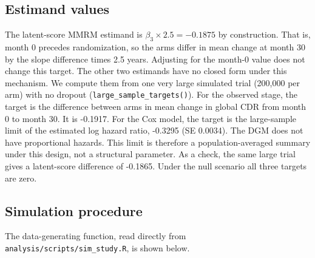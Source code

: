\documentclass[
  11pt,
]{article}
\begin{document}
\subsection{Estimand values}\label{estimand-values}

The latent-score MMRM estimand is
\(\beta_3 \times 2.5 = -0.1875\) by construction. That is,
month 0 precedes randomization, so the arms differ in mean
change at month 30 by the slope difference times
2.5 years. Adjusting for the month-0 value does not change
this target. The other two estimands have no closed form
under this mechanism. We compute them from one very large
simulated trial (200,000 per arm) with no dropout
(\texttt{large\_sample\_targets()}). For the observed stage, the
target is the difference between arms in mean change in
global CDR from month 0 to month 30. It is
-0.1917. For the Cox
model, the target is the large-sample limit of the
estimated log hazard ratio,
-0.3295 (SE
0.0034). The DGM does
not have proportional hazards. This limit is therefore a
population-averaged summary under this design, not a
structural parameter. As a check, the same large trial
gives a latent-score difference of
-0.1865. Under the null
scenario all three targets are zero.

\subsection{Simulation procedure}\label{simulation-procedure}

The data-generating function, read directly from
\texttt{analysis/scripts/sim\_study.R}, is shown below.
\end{document}
